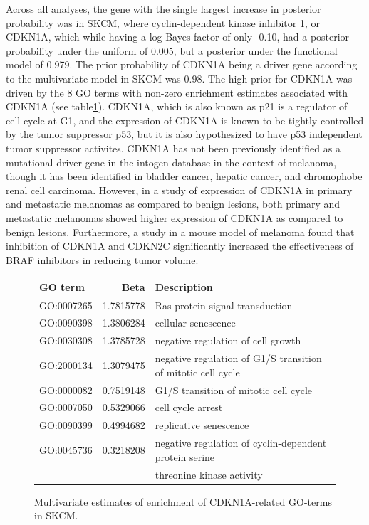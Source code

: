 Across all analyses, the gene with the single largest increase in posterior probability was in SKCM, where cyclin-dependent kinase inhibitor 1, or CDKN1A, which while having a log Bayes factor of only -0.10, had a posterior probability under the uniform of 0.005, but a posterior under the functional model of 0.979.  The prior probability of CDKN1A being a driver gene according to the multivariate model in SKCM was 0.98.  The high prior for CDKN1A was driven by the 8 GO terms with non-zero enrichment estimates associated with CDKN1A (see table\ref{tab:CDKN1A_features}).  CDKN1A, which is also known as p21 is a regulator of cell cycle at G1, and the expression of CDKN1A is known to be tightly controlled by the tumor suppressor p53, but it is also hypothesized to have p53 independent tumor suppressor activites\cite{abbas09_p21_cancer}.  CDKN1A has not been previously identified as a mutational driver gene in the intogen database in the context of melanoma, though it has been identified in bladder cancer, hepatic cancer, and chromophobe renal cell carcinoma\cite{gonzalez-perez13_intog_mutat_ident_cancer_driver}.  However, in a study of expression of CDKN1A in primary and metastatic melanomas as compared to benign lesions, both primary and metastatic melanomas showed higher expression of CDKN1A as compared to benign lesions\cite{Trotter_1997}.  Furthermore, a study in a mouse model of melanoma found that inhibition of CDKN1A and CDKN2C significantly increased the effectiveness of BRAF inhibitors in reducing tumor volume\cite{Jalili_2012}.  


\begin{figure}
  \centering
  \begin{tabular}{l|r|l}
    \hline
    GO term & Beta & Description\\
    \hline
    GO:0007265 & 1.7815778 & Ras protein signal transduction\\
    \hline
    GO:0090398 & 1.3806284 & cellular senescence\\
    \hline
    GO:0030308 & 1.3785728 & negative regulation of cell growth\\
    \hline
    GO:2000134 & 1.3079475 & negative regulation of G1/S transition of mitotic cell cycle\\
    \hline
    GO:0000082 & 0.7519148 & G1/S transition of mitotic cell cycle\\
    \hline
    GO:0007050 & 0.5329066 & cell cycle arrest\\
    \hline
    GO:0090399 & 0.4994682 & replicative senescence\\
    \hline
    GO:0045736 & 0.3218208 & negative regulation of cyclin-dependent protein serine \\
            & & threonine kinase activity\\
    \hline
  \end{tabular}\label{tab:CDKN1A_features}
  \caption{Multivariate estimates of enrichment of CDKN1A-related GO-terms in SKCM.}
\end{figure}

